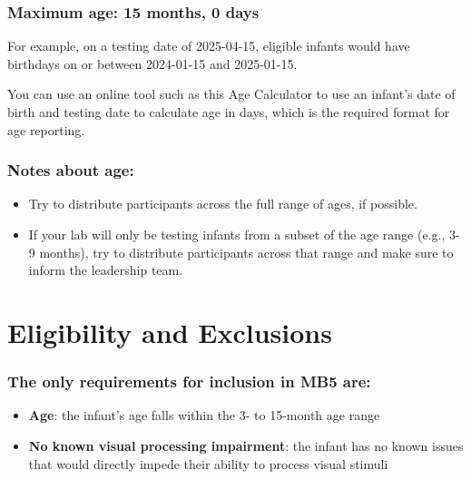 \documentclass[
  letterpaper,
  DIV=11,
  numbers=noendperiod,
  oneside]{scrreprt}
\providecommand{\tightlist}{%
  \setlength{\itemsep}{0pt}\setlength{\parskip}{0pt}}
\begin{document}
\subsubsection{\texorpdfstring{\textbf{Maximum age:} 15 months, 0
days}{Maximum age: 15 months, 0 days}}\label{maximum-age-15-months-0-days}

For example, on a testing date of 2025-04-15, eligible infants would
have birthdays on or between 2024-01-15 and 2025-01-15.

You can use an online tool such as this Age Calculator to use an
infant's date of birth and testing date to calculate age in days, which
is the required format for age reporting.

\subsubsection{Notes about age:}\label{notes-about-age}

\begin{itemize}
\tightlist
\item
  Try to distribute participants across the full range of ages, if
  possible.
\item
  If your lab will only be testing infants from a subset of the age
  range (e.g., 3-9 months), try to distribute participants across that
  range and make sure to inform the leadership team.
\end{itemize}

\section{Eligibility and Exclusions}\label{eligibility-and-exclusions}

\subsubsection{\texorpdfstring{The \textbf{only} requirements for
inclusion in MB5
are:}{The only requirements for inclusion in MB5 are:}}\label{the-only-requirements-for-inclusion-in-mb5-are}

\begin{itemize}
\tightlist
\item
  \textbf{Age}: the infant's age falls within the 3- to 15-month age
  range
\item
  \textbf{No known visual processing impairment}: the infant has no
  known issues that would directly impede their ability to process
  visual stimuli
\end{itemize}
\end{document}
